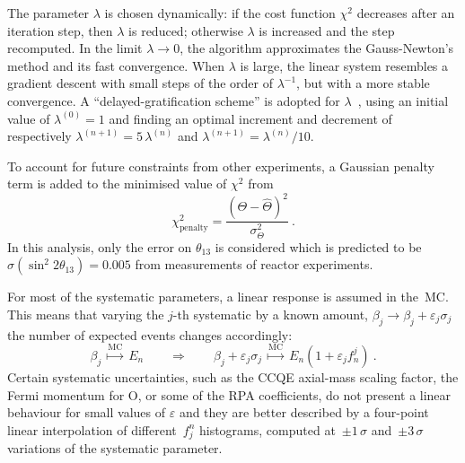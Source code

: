 The parameter $\lambda$ is chosen dynamically: if the cost function $\chi^2$ decreases %
after an iteration step, then $\lambda$ is reduced; otherwise $\lambda$ is increased and the step recomputed.
In the limit $\lambda \to 0$, the algorithm approximates the Gauss-Newton's method and its fast convergence.
When $\lambda$ is large, the linear system resembles a gradient descent with small steps of the order of $\lambda^{-1}$, %
but with a more stable convergence.
A ``delayed-gratification scheme'' is adopted for $\lambda$~\cite{Transtrum2012}, using an initial value of $\lambda^{(0)} = 1$ and finding %
an optimal increment and decrement of respectively $\lambda^{(n+1)} = 5\,\lambda^{(n)}$ and $\lambda^{(n+1)} = \lambda^{(n)} / 10$.

To account for future constraints from other experiments, a Gaussian penalty term is added %
to the minimised value of $\chi^2$ from 
\begin{equation}
	\chi^2_\text{penalty} = \frac{(\Theta - \hat{\Theta})^2}{\sigma_\Theta^2}\ .
\end{equation}
In this analysis, only the error on $\theta_{13}$ is considered %
which is predicted to be $\sigma(\sin^2 2\theta_{13}) = 0.005$ from measurements of reactor experiments.

For most of the systematic parameters, a linear response is assumed in the~MC.
This means that varying the $j$-th systematic by a known amount, $\beta_j \to \beta_j + \varepsilon_j\sigma_j$ %
the number of expected events changes accordingly:
\begin{equation}
	\label{eq:linear}
	\beta_j\ \overset{\scriptstyle \text{MC}}{\longmapsto}\ E_n %
	\qquad \Longrightarrow \qquad %
	\beta_j + \varepsilon_j\sigma_j\ \overset{\text{MC}}{\longmapsto}\ E_n ( 1 + \varepsilon_j f_n ^j )\ .
\end{equation}
Certain systematic uncertainties, such as the CCQE axial-mass scaling factor, the Fermi momentum for O, %
or some of the RPA coefficients, %
do not present a linear behaviour for small values of $\varepsilon$ %
and they are better described by a four-point linear interpolation of different~$f_j^n$ histograms, %
computed at~$\pm1\,\sigma$ and~$\pm3\,\sigma$ variations of the systematic parameter.




